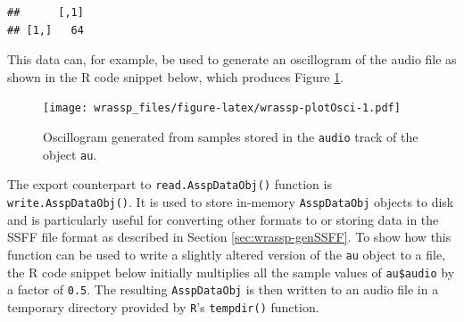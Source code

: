 \documentclass[]{book}
\newenvironment{Shaded}{\begin{snugshade}}{\end{snugshade}}
\newcommand{\CommentTok}[1]{\textcolor[rgb]{0.56,0.35,0.01}{\textit{#1}}}
\newcommand{\DataTypeTok}[1]{\textcolor[rgb]{0.13,0.29,0.53}{#1}}
\newcommand{\DecValTok}[1]{\textcolor[rgb]{0.00,0.00,0.81}{#1}}
\newcommand{\KeywordTok}[1]{\textcolor[rgb]{0.13,0.29,0.53}{\textbf{#1}}}
\newcommand{\NormalTok}[1]{#1}
\newcommand{\OperatorTok}[1]{\textcolor[rgb]{0.81,0.36,0.00}{\textbf{#1}}}
\newcommand{\StringTok}[1]{\textcolor[rgb]{0.31,0.60,0.02}{#1}}
\begin{document}
\begin{Shaded}
\end{Shaded}

\begin{verbatim}
##      [,1]
## [1,]   64
\end{verbatim}

This data can, for example, be used to generate an oscillogram of the audio file as shown in the R code snippet below, which produces Figure \ref{fig:wrassp-plotOsci}.

\begin{Shaded}
\end{Shaded}

\begin{figure}
\centering
\texttt{[image: wrassp\_files/figure-latex/wrassp-plotOsci-1.pdf]}
\caption{\label{fig:wrassp-plotOsci}Oscillogram generated from samples stored in the \texttt{audio} track of the object \texttt{au}.}
\end{figure}

The export counterpart to \texttt{read.AsspDataObj()} function is \texttt{write.AsspDataObj()}. It is used to store in-memory \texttt{AsspDataObj} objects to disk and is particularly useful for converting other formats to or storing data in the SSFF file format as described in Section \ref{sec:wrassp-genSSFF}. To show how this function can be used to write a slightly altered version of the \texttt{au} object to a file, the R code snippet below initially multiplies all the sample values of \texttt{au\$audio} by a factor of \texttt{0.5}. The resulting \texttt{AsspDataObj} is then written to an audio file in a temporary directory provided by \texttt{R}'s \texttt{tempdir()} function.
\end{document}
